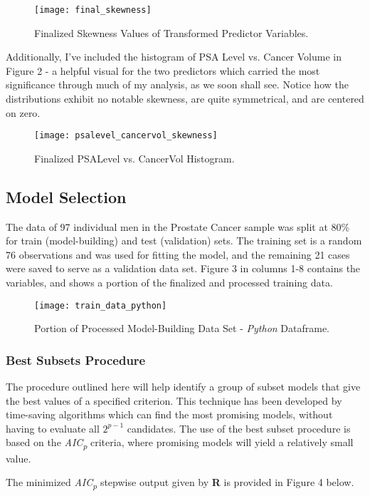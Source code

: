 \begin{figure}[H]
	\centering
	\texttt{[image: final\_skewness]}
	\caption{Finalized Skewness Values of Transformed Predictor Variables.}
\end{figure}

Additionally, I've included the histogram of PSA Level vs. Cancer Volume in Figure 2 - a helpful visual for the two predictors which carried the most significance through much of my analysis, as we soon shall see. Notice how the distributions exhibit no notable skewness, are quite symmetrical, and are centered on zero.

\begin{figure}[H]
	\centering
	\texttt{[image: psalevel\_cancervol\_skewness]}
	\caption{Finalized PSALevel vs. CancerVol Histogram.}
\end{figure}

\subsection{Model Selection}
The data of 97 individual men in the Prostate Cancer sample was split at 80\% for train (model-building) and test (validation) sets. The training set is a random 76 observations and was used for fitting the model, and the remaining 21 cases were saved to serve as a validation data set. Figure 3 in columns 1-8 contains the variables, and shows a portion of the finalized and processed training data. \par

\begin{figure}[H]
	\centering
	\texttt{[image: train\_data\_python]}
	\caption{Portion of Processed Model-Building Data Set - \textit{Python} Dataframe.}
\end{figure}

\pagebreak
\subsubsection{Best Subsets Procedure}
The procedure outlined here will help identify a group of subset models that give the best values of a specified criterion. This technique has been developed by time-saving algorithms which can find the most promising models, without having to evaluate all \(2^{p-1}\) candidates. The use of the best subset procedure is based on the \textit{AIC\textsubscript{p}} criteria, where promising models will yield a relatively small value. \par
The minimized \textit{AIC\textsubscript{p}} stepwise output given by \textbf{R} is provided in Figure 4 below.

